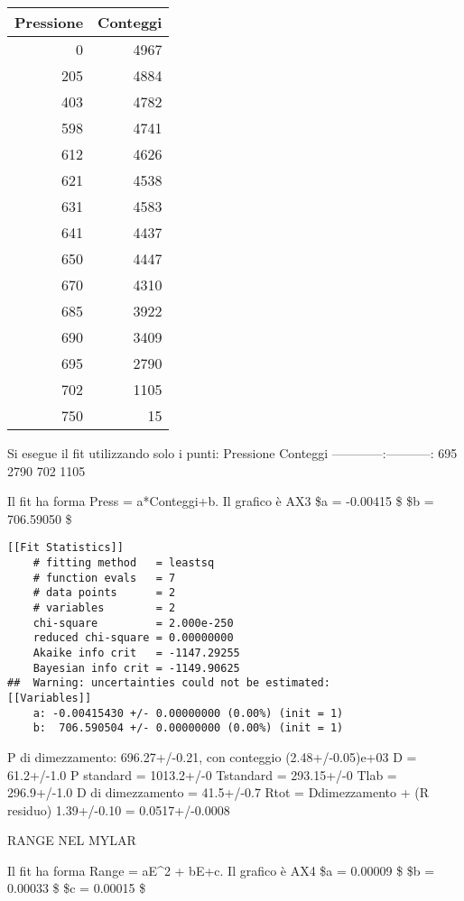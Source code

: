 \begin{longtable}[]{@{}rr@{}}
\toprule
Pressione & Conteggi \\
\midrule
\endhead
0 & 4967 \\
205 & 4884 \\
403 & 4782 \\
598 & 4741 \\
612 & 4626 \\
621 & 4538 \\
631 & 4583 \\
641 & 4437 \\
650 & 4447 \\
670 & 4310 \\
685 & 3922 \\
690 & 3409 \\
695 & 2790 \\
702 & 1105 \\
750 & 15 \\
\bottomrule
\end{longtable}

Si esegue il fit utilizzando solo i punti:
 \textbar{} Pressione \textbar{} Conteggi \textbar{}
\textbar------------:\textbar-----------:\textbar{} \textbar{} 695
\textbar{} 2790 \textbar{} \textbar{} 702 \textbar{} 1105 \textbar{}

Il fit ha forma Press = a*Conteggi+b. Il grafico è AX3 
\$a = -0.00415  \$ 
\$b = 706.59050  \$

\begin{verbatim}
[[Fit Statistics]]
    # fitting method   = leastsq
    # function evals   = 7
    # data points      = 2
    # variables        = 2
    chi-square         = 2.000e-250
    reduced chi-square = 0.00000000
    Akaike info crit   = -1147.29255
    Bayesian info crit = -1149.90625
##  Warning: uncertainties could not be estimated:
[[Variables]]
    a: -0.00415430 +/- 0.00000000 (0.00%) (init = 1)
    b:  706.590504 +/- 0.00000000 (0.00%) (init = 1) 
\end{verbatim}

P di dimezzamento: 696.27+/-0.21, con conteggio (2.48+/-0.05)e+03 
D = 61.2+/-1.0 P standard = 1013.2+/-0 
Tstandard = 293.15+/-0 Tlab = 296.9+/-1.0 
D di dimezzamento = 41.5+/-0.7 
Rtot = Ddimezzamento + (R residuo) 1.39+/-0.10 = 0.0517+/-0.0008 

RANGE NEL MYLAR

Il fit ha forma Range = aE^2 + bE+c. Il grafico è AX4 
\$a = 0.00009  \$ 
\$b = 0.00033  \$ 
\$c = 0.00015  \$

